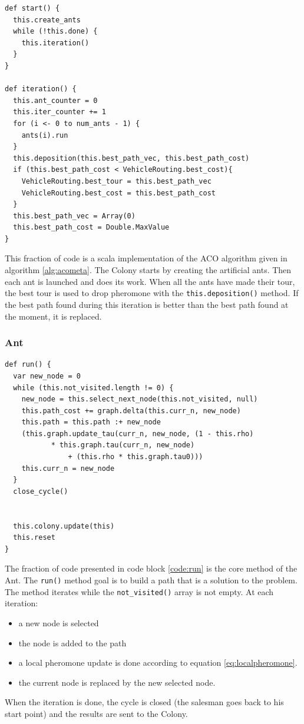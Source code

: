 	\begin{lstlisting}[captionpos=b, caption = Source code of the start and iteration method in Colony class, label= code:start]
def start() {
  this.create_ants
  while (!this.done) {
    this.iteration()
  } 
}

def iteration() {
  this.ant_counter = 0
  this.iter_counter += 1
  for (i <- 0 to num_ants - 1) {
    ants(i).run
  }
  this.deposition(this.best_path_vec, this.best_path_cost)
  if (this.best_path_cost < VehicleRouting.best_cost){
    VehicleRouting.best_tour = this.best_path_vec
    VehicleRouting.best_cost = this.best_path_cost
  }
  this.best_path_vec = Array(0)
  this.best_path_cost = Double.MaxValue
}
\end{lstlisting}
This fraction of code is a scala implementation of the ACO algorithm given in algorithm \ref{alg:acometa}. The Colony starts by creating the artificial ants. Then each ant is launched and does its work. When all the ants have made their tour, the best tour is used to drop pheromone with the \texttt{this.deposition()} method. If the best path found during this iteration is better than the best path found at the moment, it is replaced.


\subsubsection{Ant}
	
\begin{lstlisting}[captionpos=b, caption = Source code of the run method in Ant class, label= code:run]	
def run() {
  var new_node = 0
  while (this.not_visited.length != 0) {
    new_node = this.select_next_node(this.not_visited, null)
    this.path_cost += graph.delta(this.curr_n, new_node)
    this.path = this.path :+ new_node
    (this.graph.update_tau(curr_n, new_node, (1 - this.rho) 
		   * this.graph.tau(curr_n, new_node) 
			   + (this.rho * this.graph.tau0)))
    this.curr_n = new_node
  }
  close_cycle()


  this.colony.update(this)
  this.reset
}
\end{lstlisting}

The fraction of code presented in code block \ref{code:run} is the core method of the Ant. The \texttt{run()} method goal is to build a path that is a solution to the problem. The method iterates while the \texttt{not\_visited()} array is not empty. At each iteration:
\begin{itemize}
	\item a new node is selected
	\item the node is added to the path
	\item a local pheromone update is done according to equation \ref{eq:localpheromone}.
	\item the current node is replaced by the new selected node.
\end{itemize} 
When the iteration is done, the cycle is closed (the salesman goes back to his start point) and the results are sent to the Colony.


